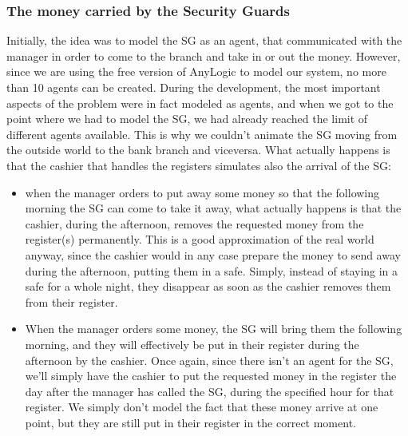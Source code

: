 \documentclass{article}
\begin{document}
\subsubsection{The money carried by the Security Guards}
Initially, the idea was to model the SG as an agent, that communicated with the manager in order to come to the branch and take in or out the money. However, since we are using the free version of AnyLogic to model our system, no more than 10 agents can be created. During the development, the most important aspects of the problem were in fact modeled as agents, and when we got to the point where we had to model the SG, we had already reached the limit of different agents available. This is why we couldn't animate the SG moving from the outside world to the bank branch and viceversa. What actually happens is that the cashier that handles the registers simulates also the arrival of the SG:
\begin{itemize}
    \item when the manager orders to put away some money so that the following morning the SG can come to take it away, what actually happens is that the cashier, during the afternoon, removes the requested money from the register(s) permanently. This is a good approximation of the real world anyway, since the cashier would in any case prepare the money to send away during the afternoon, putting them in a safe. Simply, instead of staying in a safe for a whole night, they disappear as soon as the cashier removes them from their register.
    \item When the manager orders some money, the SG will bring them the following morning, and they will effectively be put in their register during the afternoon by the cashier. Once again, since there isn't an agent for the SG, we'll simply have the cashier to put the requested money in the register the day after the manager has called the SG, during the specified hour for that register. We simply don't model the fact that these money arrive at one point, but they are still put in their register in the correct moment.
\end{itemize}
\end{document}
